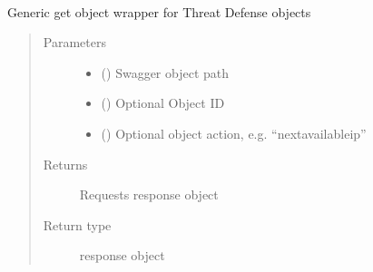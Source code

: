 \documentclass[letterpaper,10pt,english]{sphinxmanual}
\begin{document}
\begin{fulllineitems}
\label{\detokenize{b1tdlad-class:bloxone.b1tdlad}}~

\begin{fulllineitems}
\label{\detokenize{b1tdlad-class:bloxone.b1tdlad.get}}
\sphinxAtStartPar
Generic get object wrapper for Threat Defense objects
\begin{quote}\begin{description}
\item[{Parameters}] \leavevmode\begin{itemize}
\item {} 
\sphinxAtStartPar
{} () \textendash{} Swagger object path

\item {} 
\sphinxAtStartPar
{} () \textendash{} Optional Object ID

\item {} 
\sphinxAtStartPar
{} () \textendash{} Optional object action, e.g. “nextavailableip”

\end{itemize}

\item[{Returns}] \leavevmode
\sphinxAtStartPar
Requests response object

\item[{Return type}] \leavevmode
\sphinxAtStartPar
response object

\end{description}\end{quote}

\end{fulllineitems}


\end{fulllineitems}
\end{document}
